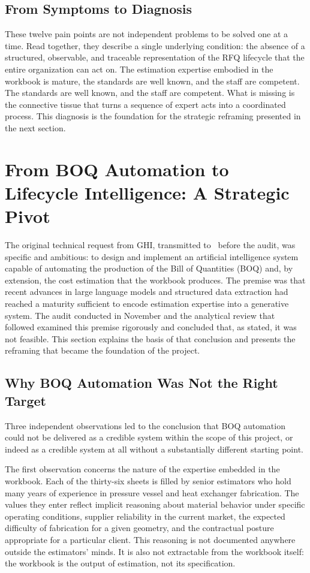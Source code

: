 \subsection*{From Symptoms to Diagnosis}
These twelve pain points are not independent problems to be solved one at a time. Read together, they describe a single underlying condition: the absence of a structured, observable, and traceable representation of the RFQ lifecycle that the entire organization can act on. The estimation expertise embodied in the workbook is mature, the standards are well known, and the staff are competent. The standards are well known, and the staff are competent. What is missing is the connective tissue that turns a sequence of expert acts into a coordinated process. This diagnosis is the foundation for the strategic reframing presented in the next section.

\section{From BOQ Automation to Lifecycle Intelligence: A Strategic Pivot}
The original technical request from GHI, transmitted to \hostCompany\ before the audit, was specific and ambitious: to design and implement an artificial intelligence system capable of automating the production of the Bill of Quantities (BOQ) and, by extension, the cost estimation that the workbook produces. The premise was that recent advances in large language models and structured data extraction had reached a maturity sufficient to encode estimation expertise into a generative system. The audit conducted in November and the analytical review that followed examined this premise rigorously and concluded that, as stated, it was not feasible. This section explains the basis of that conclusion and presents the reframing that became the foundation of the project.

\subsection*{Why BOQ Automation Was Not the Right Target}
Three independent observations led to the conclusion that BOQ automation could not be delivered as a credible system within the scope of this project, or indeed as a credible system at all without a substantially different starting point.

The first observation concerns the nature of the expertise embedded in the workbook. Each of the thirty-six sheets is filled by senior estimators who hold many years of experience in pressure vessel and heat exchanger fabrication. The values they enter reflect implicit reasoning about material behavior under specific operating conditions, supplier reliability in the current market, the expected difficulty of fabrication for a given geometry, and the contractual posture appropriate for a particular client. This reasoning is not documented anywhere outside the estimators' minds. It is also not extractable from the workbook itself: the workbook is the output of estimation, not its specification.

